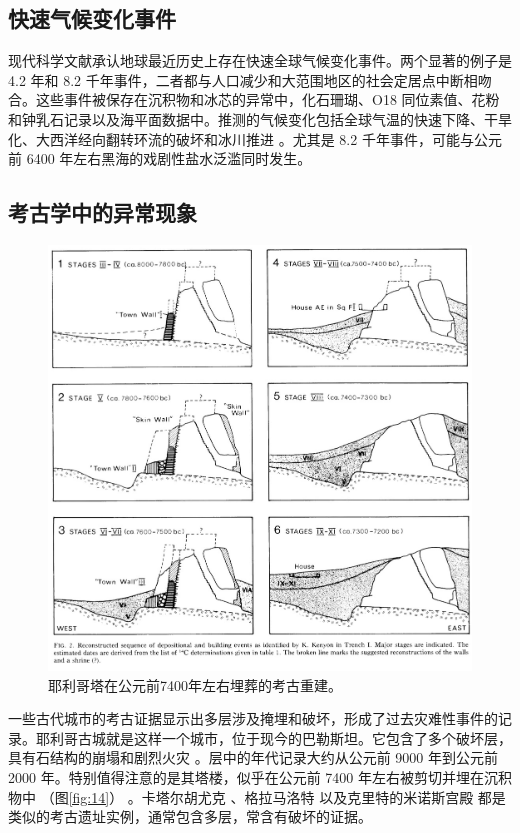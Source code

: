 \documentclass[10pt,twocolumn,letterpaper]{article}
\begin{document}
\subsection{快速气候变化事件}

现代科学文献承认地球最近历史上存在快速全球气候变化事件。两个显著的例子是 4.2 年和 8.2 千年事件，二者都与人口减少和大范围地区的社会定居点中断相吻合。这些事件被保存在沉积物和冰芯的异常中，化石珊瑚、O18 同位素值、花粉和钟乳石记录以及海平面数据中。推测的气候变化包括全球气温的快速下降、干旱化、大西洋经向翻转环流的破坏和冰川推进 \cite{90,91,92}。尤其是 8.2 千年事件，可能与公元前 6400 年左右黑海的戏剧性盐水泛滥同时发生\cite{93}。

\subsection{考古学中的异常现象}

\begin{figure}[b]
\begin{center}
   \includegraphics[width=1\linewidth]{jericho.jpg}
\end{center}
   \caption{耶利哥塔在公元前7400年左右埋葬的考古重建\cite{95}。}
\label{fig:14}
\label{fig:onecol}
\end{figure}

一些古代城市的考古证据显示出多层涉及掩埋和破坏，形成了过去灾难性事件的记录。耶利哥古城就是这样一个城市，位于现今的巴勒斯坦。它包含了多个破坏层，具有石结构的崩塌和剧烈火灾 \cite{96,97}。层中的年代记录大约从公元前 9000 年到公元前 2000 年。特别值得注意的是其塔楼，似乎在公元前 7400 年左右被剪切并埋在沉积物中 （图\ref{fig:14}） \cite{95}。卡塔尔胡尤克 \cite{99}、格拉马洛特 \cite{98} 以及克里特的米诺斯宫殿 \cite{100,101} 都是类似的考古遗址实例，通常包含多层，常含有破坏的证据。
\end{document}
